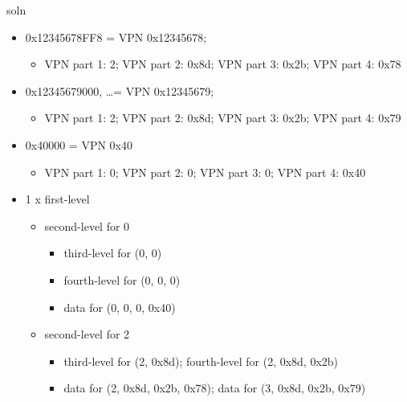 \begin{frame}{soln}
    \begin{itemize}
        \item 0x12345678FF8 = VPN 0x12345678;
            \begin{itemize}
            \item VPN part 1: 2; VPN part 2: 0x8d; VPN part 3: 0x2b; VPN part 4: 0x78
            \end{itemize}
        \item 0x12345679000, \ldots = VPN 0x12345679;
            \begin{itemize}
            \item VPN part 1: 2; VPN part 2: 0x8d; VPN part 3: 0x2b; VPN part 4: 0x79
            \end{itemize}
        \item 0x40000 = VPN 0x40
            \begin{itemize}
            \item VPN part 1: 0; VPN part 2: 0; VPN part 3: 0; VPN part 4: 0x40
            \end{itemize}
        \item 1 x first-level
            \begin{itemize}
            \item second-level for 0
                \begin{itemize}
                    \item third-level for (0, 0)
                    \item fourth-level for (0, 0, 0)
                    \item data for (0, 0, 0, 0x40)
                \end{itemize}
            \item second-level for 2
                \begin{itemize}
                    \item third-level for (2, 0x8d); fourth-level for (2, 0x8d, 0x2b)
                    \item data for (2, 0x8d, 0x2b, 0x78); data for (3, 0x8d, 0x2b, 0x79)
                \end{itemize}
            \end{itemize}
    \end{itemize}
\end{frame}

